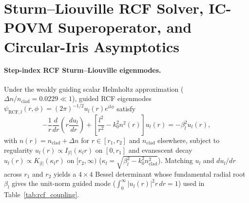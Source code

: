 \documentclass[aps,pra,reprint,nofootinbib,floatfix,longbibliography]{revtex4-2}
\newcommand{\abs}[1]{\lvert #1 \rvert}
\begin{document}
\appendix

\section{Sturm--Liouville RCF Solver, IC-POVM Superoperator, and Circular-Iris Asymptotics}
\label{app:methods}

\paragraph*{Step-index RCF Sturm--Liouville eigenmodes.}
Under the weakly guiding scalar Helmholtz approximation ($\Delta n / n_{\mathrm{clad}} = 0.0229 \ll 1$), guided RCF eigenmodes $\psi_{\mathrm{RCF},l}(r,\phi) = (2\pi)^{-1/2} u_l(r) e^{il\phi}$ satisfy
\begin{equation}
-\frac{1}{r}\frac{d}{dr}\!\left(r\frac{du_l}{dr}\right) + \left[\frac{l^2}{r^2} - k_0^2 n^2(r)\right] u_l(r) = -\beta_l^2 u_l(r),
\label{eq:app_sl_ode}
\end{equation}
with $n(r) = n_{\mathrm{clad}} + \Delta n$ for $r \in [r_1, r_2]$ and $n_{\mathrm{clad}}$ elsewhere, subject to regularity $u_l(r) \propto I_{\abs{l}}(\kappa_l r)$ on $[0,r_1]$ and evanescent decay $u_l(r) \propto K_{\abs{l}}(\kappa_l r)$ on $[r_2,\infty)$ ($\kappa_l = \sqrt{\beta_l^2 - k_0^2 n_{\mathrm{clad}}^2}$). Matching $u_l$ and $du_l/dr$ across $r_1$ and $r_2$ yields a $4\times 4$ Bessel determinant whose fundamental radial root $\beta_l$ gives the unit-norm guided mode ($\int_0^\infty \abs{u_l(r)}^2 r\,dr = 1$) used in Table~\ref{tab:rcf_coupling}.
\end{document}
